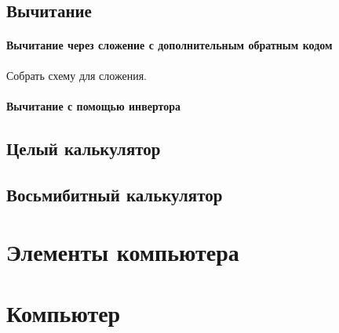 \documentclass{book}
\begin{document}
\section{Вычитание}

\subsubsection{Вычитание через сложение с дополнительным обратным кодом}

Собрать схему для сложения.

\subsubsection{Вычитание с помощью инвертора}

\section{Целый калькулятор}

\section{Восьмибитный калькулятор}

\chapter{Элементы компьютера}

\chapter{Компьютер}
\end{document}
